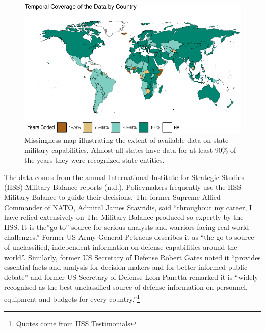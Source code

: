 \documentclass[
]{article}
\begin{document}
\begin{figure}
\centering
\includegraphics{figures/missingness-1.pdf}
\caption{\label{fig:missingness}Missingness map illustrating the extent of available data on state military capabilities. Almost all states have data for at least 90\% of the years they were recognized state entities.}
\end{figure}

The data comes from the annual International Institute for Strategic Studies (IISS) Military Balance reports (n.d.). Policymakers frequently use the IISS Military Balance to guide their decisions. The former Supreme Allied Commander of NATO, Admiral James Stavridis, said ``throughout my career, I have relied extensively on The Military Balance produced so expertly by the IISS. It is the''go to'' source for serious analysts and warriors facing real world challenges.'' Former US Army General Petraeus describes it as ``the go-to source of unclassified, independent information on defense capabilities around the world''. Similarly, former US Secretary of Defense Robert Gates noted it ``provides essential facts and analysis for decision-makers and for better informed public debate'' and former US Secretary of Defense Leon Panetta remarked it is ``widely recognised as the best unclassified source of defense information on personnel, equipment and budgets for every country.''\footnote{Quotes come from \href{https://www.iiss.org/publications/the-military-balance}{IISS Testimonials}}
\end{document}
